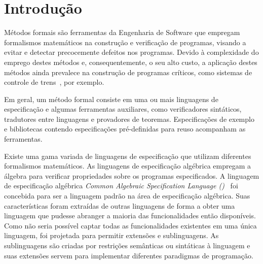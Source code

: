 \chapter{Introdução}
\label{chap:introducao}


Métodos formais são ferramentas da Engenharia de Software que empregam formalismos matemáticos na construção e verificação de programas, visando a evitar e detectar precocemente defeitos nos programas.
Devido à complexidade do emprego destes métodos e, consequentemente, o seu alto custo, a aplicação destes métodos ainda prevalece na construção de programas críticos, como sistemas de controle de trens~\cite{BadeauA05}, por exemplo.

Em geral, um método formal consiste em uma ou mais linguagens de especificação e algumas ferramentas auxiliares, como verificadores sintáticos, tradutores entre linguagens e provadores de teoremas.
Especificações de exemplo e bibliotecas contendo especificações pré-definidas para reuso acompanham as ferramentas.

Existe uma gama variada de linguagens de especificação que utilizam diferentes formalismos matemáticos.
As linguagens de especificação algébrica empregam a álgebra para verificar propriedades sobre os programas especificados.
A linguagem de especificação algébrica \textit{Common Algebraic Specification Language (\CASL)}~\cite{Astesiano2002} foi concebida para ser a linguagem padrão na área de especificação algébrica.
Suas características foram extraídas de outras linguagens de forma a obter uma linguagem que pudesse abranger a maioria das funcionalidades então disponíveis.
Como não seria possível captar todas as funcionalidades existentes em uma única linguagem, \CASL foi projetada para permitir extensões e sublinguagens.
As sublinguagens são criadas por restrições semânticas ou sintáticas à linguagem \CASL e suas extensões servem para implementar diferentes paradigmas de programação.

